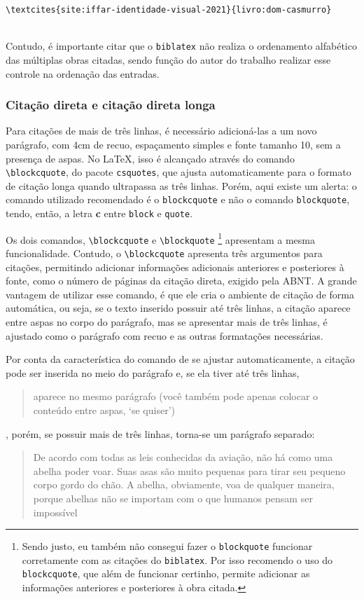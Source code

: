 \verb|\textcites{site:iffar-identidade-visual-2021}{livro:dom-casmurro}|

\textcites{site:iffar-identidade-visual-2021}{livro:dom-casmurro}\\

Contudo, é importante citar que o \verb|biblatex| não realiza o ordenamento alfabético das múltiplas obras citadas, sendo função do autor do trabalho realizar esse controle na ordenação das entradas.

\subsubsection{Citação direta e citação direta longa}
Para citações de mais de três linhas, é necessário adicioná-las a um novo parágrafo, com 4cm de recuo, espaçamento simples e fonte tamanho 10, sem a presença de aspas. No \LaTeX, isso é alcançado através do comando \verb|\blockcquote|, do pacote \verb|csquotes|, que ajusta automaticamente para o formato de citação longa quando ultrapassa as três linhas. Porém, aqui existe um alerta: o comando utilizado recomendado é o \texttt{blockcquote} e não o comando \texttt{blockquote}, tendo, então, a letra \textbf{c} entre \texttt{block} e \texttt{quote}.

Os dois comandos, \verb|\blockcquote| e \verb|\blockquote|%
\footnote{Sendo justo, eu também não consegui fazer o \texttt{blockquote} funcionar corretamente com as citações do \texttt{biblatex}. Por isso recomendo o uso do \texttt{blockcquote}, que além de funcionar certinho, permite adicionar as informações anteriores e posteriores à obra citada.} 
apresentam a mesma funcionalidade. Contudo, o \verb|\blockcquote| apresenta três argumentos para citações, permitindo adicionar informações adicionais anteriores e posteriores à fonte, como o número de páginas da citação direta, exigido pela ABNT. A grande vantagem de utilizar esse comando, é que ele cria o ambiente de citação de forma automática, ou seja, se o texto inserido possuir até três linhas, a citação aparece entre aspas no corpo do parágrafo, mas se apresentar mais de três linhas, é ajustado como o parágrafo com recuo e as outras formatações necessárias.

Por conta da característica do comando de se ajustar automaticamente, a citação pode ser inserida no meio do parágrafo e, se ela tiver até três linhas, \blockcquote{batman}{aparece no mesmo parágrafo (você também pode apenas colocar o conteúdo entre aspas, `se quiser')}, porém, se possuir mais de três linhas, torna-se um parágrafo separado:
\blockcquote[tradução nossa]{filme:bee-movie}{De acordo com todas as leis conhecidas da aviação, não há como uma abelha poder voar. Suas asas são muito pequenas para tirar seu pequeno corpo gordo do chão. A abelha, obviamente, voa de qualquer maneira, porque abelhas não se importam com o que humanos pensam ser impossível}

